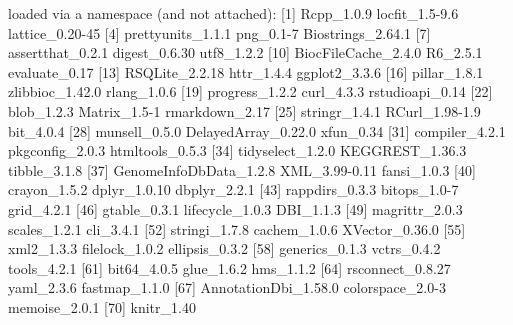 \documentclass[
]{article}
\newenvironment{Shaded}{\begin{snugshade}}{\end{snugshade}}
\newcommand{\NormalTok}[1]{#1}
\begin{document}
\begin{Shaded}
\begin{Highlighting}[]
\NormalTok{loaded via a namespace (and not attached):}
\NormalTok{ [1] Rcpp\_1.0.9             locfit\_1.5{-}9.6         lattice\_0.20{-}45       }
\NormalTok{ [4] prettyunits\_1.1.1      png\_0.1{-}7              Biostrings\_2.64.1     }
\NormalTok{ [7] assertthat\_0.2.1       digest\_0.6.30          utf8\_1.2.2            }
\NormalTok{[10] BiocFileCache\_2.4.0    R6\_2.5.1               evaluate\_0.17         }
\NormalTok{[13] RSQLite\_2.2.18         httr\_1.4.4             ggplot2\_3.3.6         }
\NormalTok{[16] pillar\_1.8.1           zlibbioc\_1.42.0        rlang\_1.0.6           }
\NormalTok{[19] progress\_1.2.2         curl\_4.3.3             rstudioapi\_0.14       }
\NormalTok{[22] blob\_1.2.3             Matrix\_1.5{-}1           rmarkdown\_2.17        }
\NormalTok{[25] stringr\_1.4.1          RCurl\_1.98{-}1.9         bit\_4.0.4             }
\NormalTok{[28] munsell\_0.5.0          DelayedArray\_0.22.0    xfun\_0.34             }
\NormalTok{[31] compiler\_4.2.1         pkgconfig\_2.0.3        htmltools\_0.5.3       }
\NormalTok{[34] tidyselect\_1.2.0       KEGGREST\_1.36.3        tibble\_3.1.8          }
\NormalTok{[37] GenomeInfoDbData\_1.2.8 XML\_3.99{-}0.11          fansi\_1.0.3           }
\NormalTok{[40] crayon\_1.5.2           dplyr\_1.0.10           dbplyr\_2.2.1          }
\NormalTok{[43] rappdirs\_0.3.3         bitops\_1.0{-}7           grid\_4.2.1            }
\NormalTok{[46] gtable\_0.3.1           lifecycle\_1.0.3        DBI\_1.1.3             }
\NormalTok{[49] magrittr\_2.0.3         scales\_1.2.1           cli\_3.4.1             }
\NormalTok{[52] stringi\_1.7.8          cachem\_1.0.6           XVector\_0.36.0        }
\NormalTok{[55] xml2\_1.3.3             filelock\_1.0.2         ellipsis\_0.3.2        }
\NormalTok{[58] generics\_0.1.3         vctrs\_0.4.2            tools\_4.2.1           }
\NormalTok{[61] bit64\_4.0.5            glue\_1.6.2             hms\_1.1.2             }
\NormalTok{[64] rsconnect\_0.8.27       yaml\_2.3.6             fastmap\_1.1.0         }
\NormalTok{[67] AnnotationDbi\_1.58.0   colorspace\_2.0{-}3       memoise\_2.0.1         }
\NormalTok{[70] knitr\_1.40 }
\end{Highlighting}
\end{Shaded}
\end{document}
